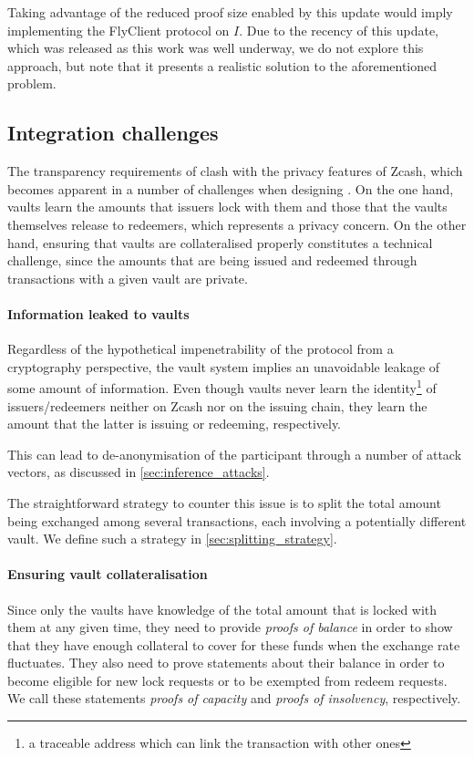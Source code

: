 Taking advantage of the reduced proof size enabled by this update would imply implementing the FlyClient protocol on $I$.
Due to the recency of this update, which was released as this work was well underway, we do not explore this approach, but note that it presents a realistic solution to the aforementioned problem.


\subsection{Integration challenges}
The transparency requirements of \xclaim clash with the privacy features of Zcash, which becomes apparent in a number of challenges when designing \zclaim.
On the one hand, vaults learn the amounts that issuers lock with them and those that the vaults themselves release to redeemers, which represents a privacy concern.
On the other hand, ensuring that vaults are collateralised properly constitutes a technical challenge, since the amounts that are being issued and redeemed through transactions with a given vault are private.

\paragraph{Information leaked to vaults}
Regardless of the hypothetical impenetrability of the protocol from a cryptography perspective, the vault system implies an unavoidable leakage of some amount of information.
Even though vaults never learn the identity\footnote{a traceable address which can link the transaction with other ones} of issuers/redeemers neither on Zcash nor on the issuing chain, they learn the amount that the latter is issuing or redeeming, respectively.

This can lead to de-anonymisation of the participant through a number of attack vectors, as discussed in \cref{sec:inference_attacks}.

The straightforward strategy to counter this issue is to split the total amount being exchanged among several transactions, each involving a potentially different vault.
We define such a strategy in \cref{sec:splitting_strategy}.

\paragraph{Ensuring vault collateralisation}
Since only the vaults have knowledge of the total amount that is locked with them at any given time, they need to provide \emph{proofs of balance} in order to show that they have enough collateral to cover for these funds when the exchange rate fluctuates.
They also need to prove statements about their balance in order to become eligible for new lock requests or to be exempted from redeem requests.
We call these statements \emph{proofs of capacity} and \emph{proofs of insolvency}, respectively.

